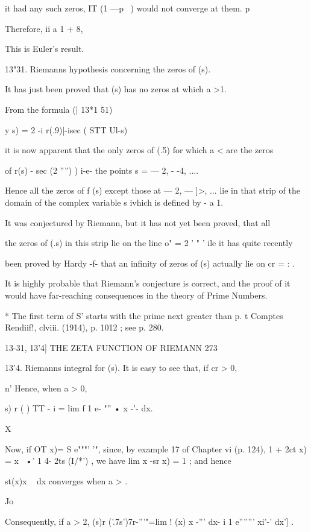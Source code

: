it had any such zeros, IT (1 —p~ ) would not converge at them. 
p 

Therefore, ii a   1 + 8, 

This is Euler's result. 

13"31. Riemanns hypothesis concerning the zeros of  (s). 

It has just been proved that  (s) has no zeros at which a >1. 

From the formula (| 13*1 51) 

y s) = 2 -i  r(.9)|-isec (  STT  Ul-s) 

it is now apparent that the only zeros of   (.5) for which a < are the zeros 

of  r(s) -  sec (2  '''') ) i-e- the points s = — 2, - -4, .... 

Hence all the zeros of f (s) except those at — 2, —  ]>, ... lie in that strip of 
the domain of the complex variable s ivhich is defined by - a   1. 

It was conjectured by Riemann, but it has not yet been proved, that all 

the zeros of  (.s) in this strip lie on the line o" = 2 ' " ' ile it has quite recently 

been proved by Hardy -f- that an infinity of zeros of  (s) actually lie on cr = :  . 

It is highly probable that Riemann's conjecture is correct, and the proof of 
it would have far-reaching consequences in the theory of Prime Numbers. 

* The first term of S' starts with the prime next greater than p. 
t Comptes Rendiif!, clviii. (1914), p. 1012 ; see p. 280. 



13-31, 13'4] THE ZETA FUNCTION OF RIEMANN 273 

13'4. Riemanns integral for  (s). 
It is easy to see that, if cr > 0, 



n' 
Hence, when a > 0, 



   s) r (   ) TT - i  = lim f 1 e- "'' •  x -'-   dx. 

X 

Now, if OT  x)= S e"""' '", since, by example 17 of Chapter vi (p. 124), 
1 + 2ct  x) = x~ •'  1 4- 2ts (I/*') , we have lim x  -sr  x) = 1 ; and hence 

 st(x)x ~  dx converges when a > .  

Jo 

Consequently, if a > 2, 
 (s)r ('.7s')7r-'''"=lim !   (x) x -'''  dx- i 1 e''''''' xi'-' dx'] . 

